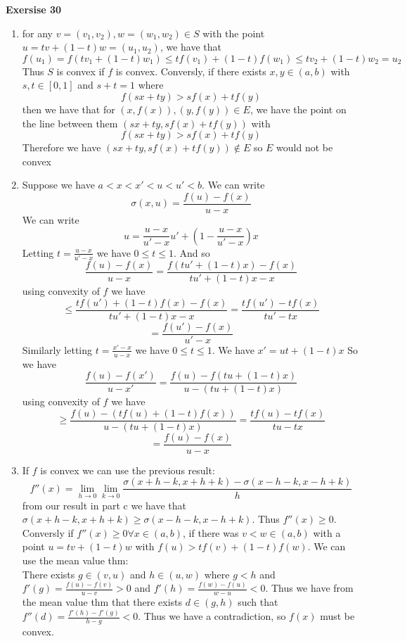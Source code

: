 \documentclass[12pt]{article}
\newenvironment{ques}[1]{\textbf{Exersise #1}\vspace{1 mm}\\ }{\bigskip}
\theoremstyle{definition}
\renewcommand{\l}{\left }
\renewcommand{\r}{\right }
\begin{document}
\begin{ques}{30}
\begin{enumerate}
\item
	for any $v = (v_1,v_2), w = (w_1,w_2) \in S$ with the point $u = tv + (1-t)w =
	(u_1, u_2)$, we have that
	$$f(u_1) = f\l(tv_1 + (1-t)w_1\r)  \leq tf(v_1) + (1 - t)f(w_1) \leq tv_2 +
	(1-t)w_2 = u_2$$
	Thus $S$ is convex if $f$ is convex. Conversly, if there exists $x,y \in (a,b)$
	with $s,t\in [0,1]$ and $s+t = 1$ where
	$$f(sx + ty) > sf(x) + tf(y)$$
	then we have that for $(x,f(x)), (y,f(y)) \in E$, we have the point on the
	line between them $(sx + ty, sf(x) + tf(y))$ with 
	$$f(sx + ty) > sf(x) + tf(y)$$
	Therefore we have $(sx + ty, sf(x) + tf(y)) \notin E$ so $E$ would not be
	convex

\addtocounter{enumi}{1}
\item
	Suppose we have $a< x< x' < u < u' <b$. We can write
	$$\sigma(x,u) = \frac{f(u) - f(x)}{u - x}$$
	We can write
	$$u = \frac{u - x}{u' - x}u' + \l(1 - \frac{u - x}{u' - x}\r)x$$
	Letting $t = \frac{u - x}{u' - x}$ we have $0 \leq t \leq 1$. And so
	$$\frac{f(u) - f(x)}{u - x} = \frac{f(tu' + (1-t)x) - f(x)}{tu' + (1-t)x - x}$$
	using convexity of $f$ we have
	$$\leq \frac{tf(u') + (1-t)f(x) - f(x)}{tu' + (1-t)x - x} = \frac{tf(u')
	-tf(x)}{tu' -tx}$$
	$$= \frac{f(u') - f(x)}{u'-x}$$
	Similarly letting $t = \frac{x' - x}{u-x}$ we have $0 \leq t \leq 1$. We
	have $x' = ut + (1-t)x$ So we have
	$$\frac{f(u) - f(x')}{u - x'} = \frac{f(u) - f(tu + (1-t)x)}{u - (tu + (1-t)x)}$$
	using convexity of $f$ we have
	$$\geq \frac{f(u) - (tf(u) + (1-t)f(x))}{u - (tu + (1-t)x)} = \frac{tf(u)
	-tf(x)}{tu -tx}$$
	$$= \frac{f(u) - f(x)}{u-x}$$
\item
	If $f$ is convex we can use the previous result:\\
	$$f''(x) = \lim_{h \to 0} \lim_{k \to 0} \frac{\sigma(x + h -k, x + h + k) -
	\sigma(x - h -k, x - h + k)}{h}$$
	from our result in part c we have that $\sigma(x + h -k, x + h + k) \geq
	\sigma(x - h -k, x - h + k)$. Thus $f''(x) \geq 0$.\\
	Conversly if $f''(x) \geq 0 \forall x \in (a,b)$, if there was $v < w \in (a,b)$
	with a point $u = tv + (1-t)w$ with $f(u) > tf(v) + (1-t)f(w)$. We can use
	the mean value thm:\\
	There exists $g \in (v,u)$ and $h \in (u,w)$ where  $g < h$ and $f'(g) = \frac{f(u) -
	f(v)}{u-v} > 0$ and $f'(h) = \frac{f(w) - f(u)}{w-u} < 0$. Thus we have
	from the mean value thm that there exists $d \in (g, h)$ such that $f''(d)
	= \frac{f'(h) - f'(g)}{h - g} < 0$. Thus we have a contradiction, so $f(x)$
	must be convex.
	
\end{enumerate}
\end{ques}
\end{document}
